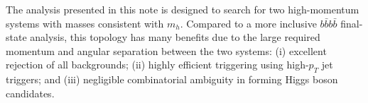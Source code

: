 The analysis presented in this note is designed to search for two high-momentum \bbbar systems with masses consistent with $m_{h}$. Compared to a more inclusive $b\bar{b}b\bar{b}$ final-state analysis, this topology has many benefits due to the large required momentum and angular separation between the two \bbbar systems: (i) excellent rejection of all backgrounds; (ii) highly efficient triggering using high-$p_{T}$ jet triggers; and (iii) negligible combinatorial ambiguity in forming Higgs boson candidates.




